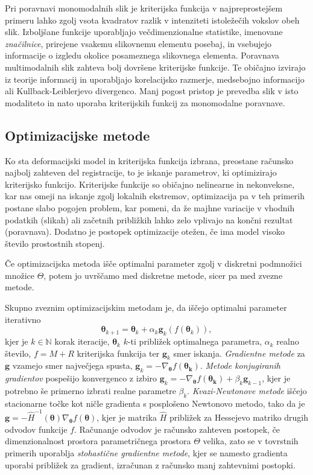 \documentclass[journal]{IEEEtran}
\begin{document}
Pri poravnavi monomodalnih slik je kriterijska funkcija v najpreprostejšem primeru lahko zgolj vsota kvadratov razlik v intenziteti istoležečih vokslov obeh slik. Izboljšane funkcije uporabljajo večdimenzionalne statistike, imenovane \emph{značilnice}, prirejene vsakemu slikovnemu elementu posebaj, in vsebujejo informacije o izgledu okolice posameznega slikovnega elementa. Poravnava multimodalnih slik zahteva bolj dovršene kriterijske funkcije. Te običajno izvirajo iz teorije informacij in uporabljajo korelacijsko razmerje, medsebojno informacijo ali Kullback-Leiblerjevo divergenco. Manj pogost pristop je prevedba slik v isto modaliteto in nato uporaba kriterijskih funkcij za monomodalne poravnave.

\subsection{Optimizacijske metode}

Ko sta deformacijski model in kriterijska funkcija izbrana, preostane računsko najbolj zahteven del registracije, to je iskanje parametrov, ki optimizirajo kriterijsko funkcijo. Kriterijske funkcije so običajno nelinearne in nekonveksne, kar nas omeji na iskanje zgolj lokalnih ekstremov, optimizacija pa v teh primerih postane slabo pogojen problem, kar pomeni, da že majhne variacije v vhodnih podatkih (slikah) ali začetnih približkih lahko zelo vplivajo na končni rezultat (poravnava). Dodatno je postopek optimizacije otežen, če ima model visoko število prostostnih stopenj.

Če optimizacijska metoda išče optimalni parameter zgolj v diskretni podmnožici množice $\Theta$, potem  jo uvrščamo med diskretne metode, sicer pa med zvezne metode.

Skupno zveznim optimizacijskim metodam je, da iščejo optimalni parameter iterativno
\begin{equation}
 \boldsymbol{\theta}_{k+1}=\boldsymbol{\theta}_k+\alpha_k\boldsymbol{g}_k(f(\boldsymbol{\theta}_k)),
\end{equation}
kjer je $k\in\mathbb{N}$ korak iteracije, $\boldsymbol{\theta}_k$ $k$-ti približek optimalnega parametra, $\alpha_k$ realno število, $f=M+R$ kriterijska funkcija ter $\boldsymbol{g}_k$ smer iskanja. \emph{Gradientne metode} za $\boldsymbol{g}$ vzamejo smer največjega spusta, $\boldsymbol{g}_k = -\nabla_{\boldsymbol{\theta}}f(\boldsymbol{\theta_k})$. \emph{Metode konjugiranih gradientov} pospešijo konvergenco z izbiro $\boldsymbol{g}_k = -\nabla_{\boldsymbol{\theta}}f(\boldsymbol{\theta_k})+\beta_k\boldsymbol{g}_{k-1}$, kjer je potrebno še primerno izbrati realne parametre $\beta_k$. \emph{Kvazi-Newtonove metode} iščejo stacionarne točke kot ničle gradienta s posplošeno Newtonovo metodo, tako da je $\boldsymbol{g}=-\hat{H}^{-1}(\boldsymbol{\theta})\nabla_{\boldsymbol{\theta}}f(\boldsymbol{\theta})$, kjer je matrika $\hat{H}$ približek za Hessejevo matriko drugih odvodov funkcije $f$. Računanje odvodov je računsko zahteven postopek, če dimenzionalnost prostora parametričnega prostora $\Theta$ velika, zato se v tovrstnih primerih uporablja \emph{stohastične gradientne metode}, kjer se namesto gradienta uporabi približek za gradient, izračunan z računsko manj zahtevnimi postopki.
\end{document}
